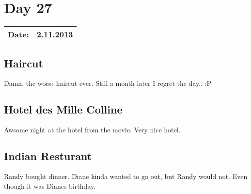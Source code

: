 \section{Day 27}
\begin{tabular}{|c|c|}
\hline
Date: & 2.11.2013 \\
\hline
\end{tabular}
\subsection{Haircut}
Damn, the worst haircut ever. Still a month later I regret the day.. :P
\subsection{Hotel des Mille Colline}
Awsome night at the hotel from the movie. Very nice hotel. 
\subsection{Indian Resturant}
Randy bought dinner. Diane kinda wanted to go out, but Randy would not. Even though it was Dianes birthday.
